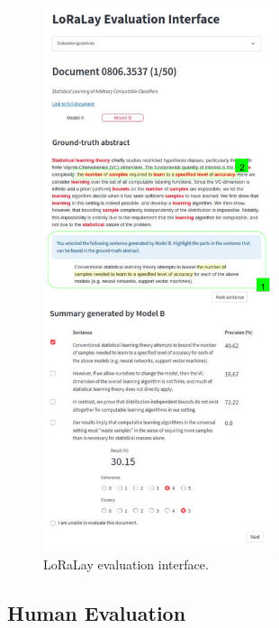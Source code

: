 \begin{figure}
  \centering
  \includegraphics[width=0.6\textwidth]{images/chapter5/interface_snapshot_details.pdf}
\caption{LoRaLay evaluation interface.}
\label{fig:loralay-eval-interface}
\end{figure}


\subsection{Human Evaluation}


